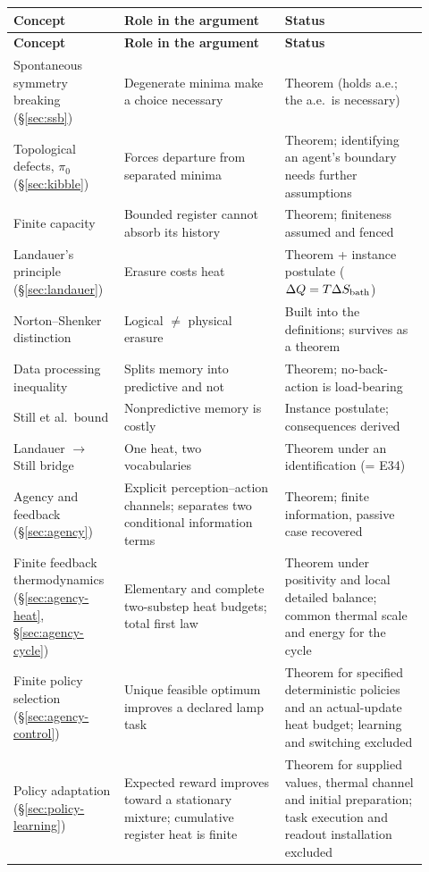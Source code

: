 \documentclass[11pt]{article}
\begin{document}
\begingroup
\small
\begin{longtable}{@{}p{0.24\linewidth}p{0.36\linewidth}p{0.32\linewidth}@{}}
\hline
\textbf{Concept} & \textbf{Role in the argument} & \textbf{Status} \\
\hline
\endfirsthead
\hline
\textbf{Concept} & \textbf{Role in the argument} & \textbf{Status} \\
\hline
\endhead
Spontaneous symmetry breaking (\S\ref{sec:ssb}) & Degenerate minima make a choice necessary & Theorem (holds a.e.; the a.e.\ is necessary) \\
Topological defects, $\pi_0$ (\S\ref{sec:kibble}) & Forces departure from separated minima & Theorem; identifying an agent's boundary needs further assumptions \\
Finite capacity & Bounded register cannot absorb its history & Theorem; finiteness assumed and fenced \\
Landauer's principle (\S\ref{sec:landauer}) & Erasure costs heat & Theorem + instance postulate ($\Delta Q=T\Delta S_{\rm bath}$) \\
Norton--Shenker distinction & Logical $\ne$ physical erasure & Built into the definitions; survives as a theorem \\
Data processing inequality & Splits memory into predictive and not & Theorem; no-back-action is load-bearing \\
Still et al.\ bound & Nonpredictive memory is costly & Instance postulate; consequences derived \\
Landauer $\to$ Still bridge & One heat, two vocabularies & Theorem under an identification (= E34) \\
Agency and feedback (\S\ref{sec:agency}) & Explicit perception--action channels; separates two conditional information terms & Theorem; finite information, passive case recovered \\
Finite feedback thermodynamics (\S\ref{sec:agency-heat}, \S\ref{sec:agency-cycle}) & Elementary and complete two-substep heat budgets; total first law & Theorem under positivity and local detailed balance; common thermal scale and energy for the cycle \\
Finite policy selection (\S\ref{sec:agency-control}) & Unique feasible optimum improves a declared lamp task & Theorem for specified deterministic policies and an actual-update heat budget; learning and switching excluded \\
Policy adaptation (\S\ref{sec:policy-learning}) & Expected reward improves toward a stationary mixture; cumulative register heat is finite & Theorem for supplied values, thermal channel and initial preparation; task execution and readout installation excluded \\

\end{longtable}
\end{document}
